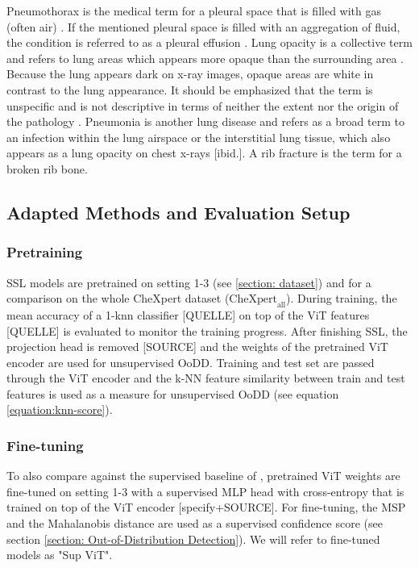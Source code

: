 Pneumothorax is the medical term for a pleural space that is filled with gas (often air) \citep{Dahnert2011,Hansell2008}.
If the mentioned pleural space is filled with an aggregation of fluid, the condition is referred to as a pleural effusion \citep{Karkhanis2012}.
Lung opacity is a collective term and refers to lung areas which appears more opaque than the surrounding area \citep{Hansell2008}.
Because the lung appears dark on x-ray images, opaque areas are white in contrast to the lung appearance.
It should be emphasized that the term is unspecific and is not descriptive in terms of neither the extent nor the origin of the pathology \citep{Hansell2008}.
Pneumonia is another lung disease and refers as a broad term to an infection within the lung airspace or the interstitial lung tissue, which also appears as a lung opacity on chest x-rays [ibid.].
A rib fracture is the term for a broken rib bone.
\subsection{Adapted Methods and Evaluation Setup}
\label{section: adapted-methods}
\subsubsection*{Pretraining}
SSL models are pretrained on setting 1-3 (see \ref{section: dataset}) and for a comparison on the whole CheXpert dataset ($\text{CheXpert}_\text{all}$).
During training, the mean accuracy of a 1-knn classifier [QUELLE] on top of the ViT features [QUELLE] is evaluated to monitor the training progress.
After finishing SSL, the projection head is removed [SOURCE] and the weights of the pretrained ViT encoder are used for unsupervised OoDD.
Training and test set are passed through the ViT encoder and the k-NN feature similarity between train and test features is used as a measure for unsupervised OoDD (see equation \ref{equation:knn-score}).
\par
\subsubsection*{Fine-tuning}
To also compare against the supervised baseline of \citep{Berger2021}, pretrained ViT weights are fine-tuned on setting 1-3 with a supervised MLP head with cross-entropy that is trained on top of the ViT encoder [specify+SOURCE].
For fine-tuning, the MSP and the Mahalanobis distance are used as a supervised confidence score (see section \ref{section: Out-of-Distribution Detection}).
We will refer to fine-tuned models as "Sup ViT".
\par
